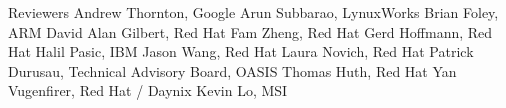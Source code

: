 \begin{oasistitlesection}{Reviewers}
Andrew Thornton,  Google \newline
Arun Subbarao,	LynuxWorks	\newline
Brian Foley,  ARM \newline
David Alan Gilbert, Red Hat \newline
Fam Zheng, Red Hat	\newline
Gerd Hoffmann, Red Hat	\newline
Halil Pasic,	IBM	\newline
Jason Wang, Red Hat \newline
Laura Novich, Red Hat	\newline
Patrick Durusau,	Technical Advisory Board, OASIS	\newline
Thomas Huth,	Red Hat	\newline
Yan Vugenfirer, Red Hat / Daynix	\newline
Kevin Lo,	MSI	\newline
\end{oasistitlesection}
